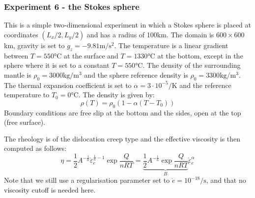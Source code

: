 \subsubsection*{Experiment 6 - the Stokes sphere}

This is a simple two-dimensional experiment in which a Stokes sphere is placed at coordinates 
$(L_x/2,L_y/2)$ and has a radius of 100\si{\kilo\metre}. 
The domain is $600\times600$\si{\kilo\metre}, 
gravity is set to $g_z=-9.81\si{\metre\per\square\second}$.
The temperature is a linear gradient between  $T=550\si{\celsius}$ 
at the surface and $T=1330\si{\celsius}$ at the bottom,
except in the sphere where it is set to a constant $T=550\si{\celsius}$.
The density of the surrounding mantle is $\rho_0=3000\si{\kilogram\per\cubic\meter}$ 
and the sphere reference density is $\rho_0=3300\si{\kilogram\per\cubic\meter}$. The thermal expansion 
coefficient is set to $\alpha=3\cdot 10^{-5} \si{\per\kelvin}$ and the reference temperature to $T_0=0\si{\celsius}$.
The density is given by: 
\[
\rho(T)=\rho_0(1-\alpha(T-T_0))
\]
Boundary conditions are free slip at the bottom and the sides, open at the top (free surface).

The rheology is of the dislocation creep type and the effective viscosity is then computed as follows:
\[
\eta 
= \frac{1}{2} A^{-\frac1n} \dot\varepsilon_e^{\frac1n-1}  \exp \frac{Q}{nRT} 
= \underbrace{ \frac{1}{2} A^{-\frac1n} \exp \frac{Q}{nRT} }_{B} \dot\varepsilon_e^{\alpha}  
\]
Note that we still use a regularisation parameter set to $\dot{e}=10^{-18}\si{\per\second}$, 
and that no viscosity cutoff is needed here. 


